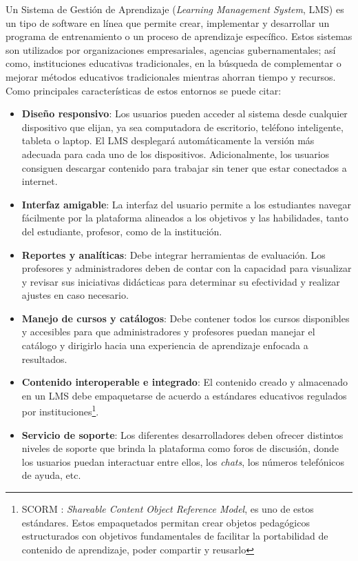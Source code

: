 Un Sistema de Gestión de Aprendizaje (\textit{Learning Management System}, LMS) es un tipo de software en línea que permite crear, implementar y desarrollar un programa de entrenamiento o un proceso de aprendizaje específico. Estos sistemas son utilizados por organizaciones empresariales, agencias gubernamentales; así como, instituciones educativas tradicionales, en la búsqueda de complementar o mejorar métodos educativos tradicionales mientras ahorran tiempo y recursos. Como principales características de estos entornos se puede citar: 
\begin{itemize}
    \item \textbf{Diseño responsivo}: Los usuarios pueden acceder al sistema desde cualquier dispositivo que elijan, ya sea computadora de escritorio, teléfono inteligente, tableta o laptop. El LMS desplegará automáticamente la versión más adecuada para cada uno de los dispositivos. Adicionalmente, los usuarios consiguen descargar contenido para trabajar sin tener que estar conectados a internet.
    \item \textbf{Interfaz amigable}: La interfaz del usuario permite a los estudiantes navegar fácilmente por la plataforma alineados a los objetivos y las habilidades, tanto del estudiante, profesor, como de la institución.
    \item \textbf{Reportes y analíticas}: Debe integrar herramientas de evaluación. Los profesores y administradores deben de contar con la capacidad para visualizar y revisar sus iniciativas didácticas para determinar su efectividad y realizar ajustes en caso necesario.
    \item \textbf{Manejo de cursos y catálogos}: Debe contener todos los cursos disponibles y accesibles para que administradores y profesores puedan manejar el catálogo y dirigirlo hacia una experiencia de aprendizaje enfocada a resultados.
    \item \textbf{Contenido interoperable e integrado}: El contenido creado y almacenado en un LMS debe empaquetarse de acuerdo a estándares educativos regulados por instituciones\footnote[1]{SCORM : \textit{Shareable Content Object Reference Model}, es uno de estos estándares. Estos empaquetados permitan crear objetos pedagógicos estructurados con objetivos fundamentales de facilitar la portabilidad de contenido de aprendizaje, poder compartir y reusarlo}.
    \item \textbf{Servicio de soporte}: Los diferentes desarrolladores deben ofrecer distintos niveles de soporte que brinda la plataforma como foros de discusión, donde los usuarios puedan interactuar entre ellos, los \textit{chats}, los números telefónicos de ayuda, etc.
\end{itemize}

